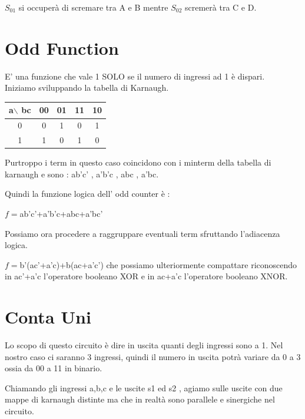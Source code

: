 \documentclass[a4paper]{book}
\begin{document}
\(S_01 \) si occuperà di scremare tra A e B mentre \(S_02 \) scremerà tra C e D.


\section{Odd Function}

E' una funzione che vale 1 SOLO se il numero di ingressi ad 1 è dispari.\\
Iniziamo sviluppando la tabella di Karnaugh.\\

\vspace{\baselineskip}

\begin{tabular}{|c|c|c|c|c|}
\hline
a$\backslash$ bc & 00 & 01 & 11 & 10 \\
\hline
0              & 0  &  \cellcolor{yellow}1 & 0  & \cellcolor{yellow}1  \\
\hline
1              & \cellcolor{yellow}1  &  0 & \cellcolor{yellow}1  & 0  \\
\hline
\end{tabular}
\vspace{\baselineskip}

Purtroppo i term in questo caso coincidono con i minterm della tabella di karnaugh e sono : ab'c' , a'b'c , abc , a'bc.

Quindi la funzione logica dell' odd counter è :

\(f=\)ab'c'+a'b'c+abc+a'bc'

Possiamo ora procedere a raggruppare eventuali term sfruttando l'adiacenza logica.

\(f=\)b'(ac'+a'c)+b(ac+a'c') che possiamo ulteriormente compattare riconoscendo in ac'+a'c l'operatore booleano XOR e in ac+a'c l'operatore booleano XNOR.




\section{Conta Uni}

Lo scopo di questo circuito è dire in uscita quanti degli ingressi sono a 1. Nel nostro caso ci saranno 3 ingressi, quindi il numero in uscita potrà variare da 0 a 3 ossia da 00 a 11 in binario.


Chiamando gli ingressi a,b,c e le uscite s1 ed s2 , agiamo sulle uscite con due mappe di karnaugh distinte ma che in realtà sono parallele e sinergiche nel circuito.
\end{document}
